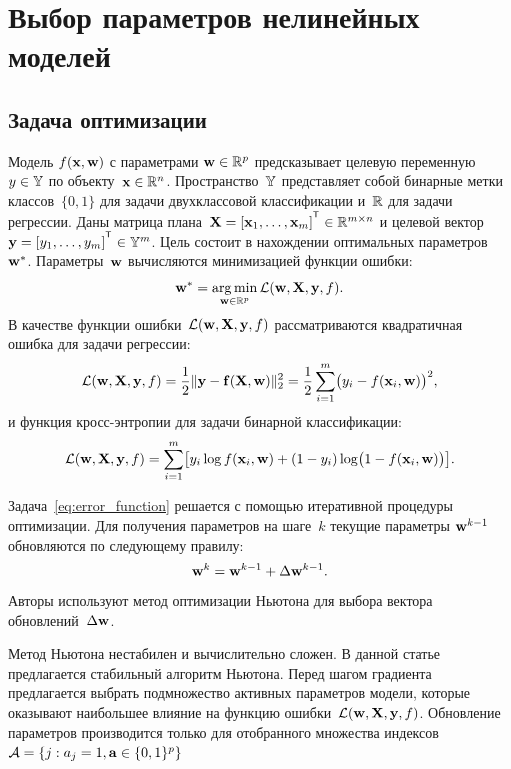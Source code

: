 \chapter{Выбор параметров нелинейных моделей}

\section{Задача оптимизации}

Модель $f( \mathbf{x}, \mathbf{w})$ с параметрами $\mathbf{w} \in \mathbb{R}^p$ предсказывает целевую переменную~$y \in \mathbb{Y}$ по объекту~$\mathbf{x} \in \mathbb{R}^{n}$. Пространство~$\mathbb{Y}$ представляет собой бинарные метки классов~$\{0, 1\}$ для задачи двухклассовой классификации и~$\mathbb{R}$ для задачи регрессии.
Даны матрица плана~$\bX = [\bx_1, \dots, \bx_m]^{\T} \in \bbR^{m \times n}$ и целевой вектор~$\by = [y_1, \dots, y_m]^{\T} \in \bbY^{m}$. 
Цель состоит в нахождении оптимальных параметров~$\mathbf{w}^*$.
Параметры~$\mathbf{w}$ вычисляются минимизацией функции ошибки:
\begin{equation}
\mathbf{w}^* = \mathop{\arg \min}\limits_{\mathbf{w} \in \mathbb{R}^p} \mathcal{L}(\mathbf{w}, \mathbf{X}, \mathbf{y}, f).
\label{eq:error_function}
\end{equation}
В качестве функции ошибки~$\mathcal{L} (\mathbf{w}, \mathbf{X}, \mathbf{y}, f)$ рассматриваются квадратичная ошибка для задачи регрессии:
\begin{equation}
\mathcal{L}(\mathbf{w}, \mathbf{X}, \mathbf{y}, f) = \frac 12 \| \mathbf{y} - \mathbf{f}(\mathbf{X}, \mathbf{w}) \|_2^2 = \frac 12 \sum_{i=1}^m \bigl( y_i - f(\mathbf{x}_i,  \mathbf{w})\bigr)^2,
\label{eq:squared_error}
\end{equation}
и функция кросс-энтропии для задачи бинарной классификации: 
\begin{equation}
\mathcal{L}(\mathbf{w}, \mathbf{X}, \mathbf{y}, f) = \sum_{i=1}^m \bigl[y_i \log f (\mathbf{x}_i , \mathbf{w}) + (1-y_i) \log \bigl(1 - f (\mathbf{x}_i , \mathbf{w})\bigr)\bigr].
\label{eq:log_loss}
\end{equation}

Задача~\eqref{eq:error_function} решается с помощью итеративной процедуры оптимизации. 
Для получения параметров на шаге~$k$ текущие параметры $\mathbf{w}^{k-1}$ обновляются по следующему правилу:
\begin{equation}
\mathbf{w}^k = \mathbf{w}^{k - 1} + \Delta \mathbf{w}^{k - 1}.
\label{eq:update_rule}
\end{equation}
Авторы используют метод оптимизации Ньютона для выбора вектора обновлений~$\Delta \mathbf{w}$.

Метод Ньютона нестабилен и вычислительно сложен. 
В данной статье предлагается стабильный алгоритм Ньютона. 
Перед шагом градиента предлагается выбрать подмножество активных параметров модели, которые оказывают наибольшее влияние на функцию ошибки~$\mathcal{L} (\mathbf{w}, \mathbf{X}, \mathbf{y}, f)$.
Обновление параметров производится только для отобранного множества индексов~$\mathcal{A} = \{j: a_j = 1, \mathbf{a} \in \{0, 1\}^p\}$


